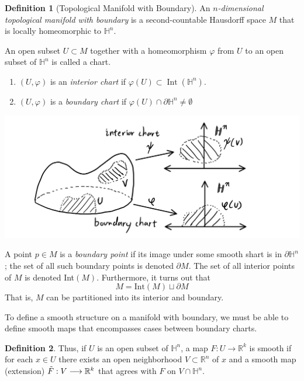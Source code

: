 \documentclass{article}
\DeclareMathOperator{\Int}{Int}
\theoremstyle{remark}
\theoremstyle{definition}
\newtheorem{definition}{Definition}[section]
\begin{document}
\begin{definition}[Topological Manifold with Boundary]
An \textit{$n$-dimensional topological manifold with boundary} is a second-countable Hausdorff space $M$ that is locally homeomorphic to $\mathbb{H}^n$. 

An open subset $U \subset M$ together with a homeomorphism $\varphi$ from $U$ to an open subset of $\mathbb{H}^n$ is called a chart.
\begin{enumerate}
    \item $(U, \varphi)$ is an \textit{interior chart} if $\varphi(U) \subset \Int(\mathbb{H}^n)$. 
    \item $(U, \varphi)$ is a \textit{boundary chart} if $\varphi(U) \cap \partial \mathbb{H}^n \neq \emptyset$
\end{enumerate}
\begin{center}
    \includegraphics[scale=0.25]{img/Interior_Boundary_Chart.PNG}
\end{center}
A point $p \in M$ is a \textit{boundary point} if its image under some smooth shart is in $\partial \mathbb{H}^n$; the set of all such boundary points is denoted $\partial M$. The set of all interior points of $M$ is denoted Int$(M)$. Furthermore, it turns out that
\[M = \text{Int}(M) \sqcup \partial M\]
That is, $M$ can be partitioned into its interior and boundary. 
\end{definition}

To define a smooth structure on a manifold with boundary, we must be able to define smooth maps that encompasses cases between boundary charts. 

\begin{definition}
Thus, if $U$ is an open subset of $\mathbb{H}^n$, a map $F: U \longrightarrow \mathbb{R}^k$ is smooth if for each $x \in U$ there exists an open neighborhood $V \subset \mathbb{R}^n$ of $x$ and a smooth map (extension) $\Tilde{F}: V \longrightarrow \mathbb{R}^k$ that agrees with $F$ on $V \cap \mathbb{H}^n$. 
\end{definition}
\end{document}
